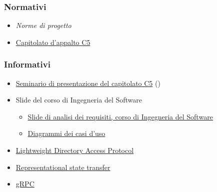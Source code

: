 \documentclass[../analisi-dei-requisiti.tex]{subfiles}
\begin{document}
\subsubsection{Normativi}%
\label{par:normativi}
\begin{itemize}
  \item \textit{Norme di progetto}
  \item \href{https://www.math.unipd.it/~tullio/IS-1/2019/Progetto/C5.pdf}{Capitolato d'appalto C5}
\end{itemize}

\subsubsection{Informativi}%
\label{par:informativi}
\begin{itemize}
  \item \href{https://www.math.unipd.it/~tullio/IS-1/2019/Dispense/C5a.pdf}{Seminario di presentazione del capitolato C5} ()
  \item Slide del corso di Ingegneria del Software
        \begin{itemize}
          \item \href{https://www.math.unipd.it/~tullio/IS-1/2019/Dispense/L08.pdf}{Slide di analisi dei requisiti, corso di Ingegneria del Software}
          \item \href{https://www.math.unipd.it/~tullio/IS-1/2019/Dispense/E03.pdf}{Diagrammi dei casi d'uso}
        \end{itemize}
  \item \href{https://www.openldap.org/}{Lightweight Directory Access Protocol}
  \item \href{https://www.ics.uci.edu/~fielding/pubs/dissertation/rest_arch_style.htm}{Representational state transfer}
  \item \href{https://grpc.io/docs/guides/}{gRPC}
\end{itemize}
\end{document}
